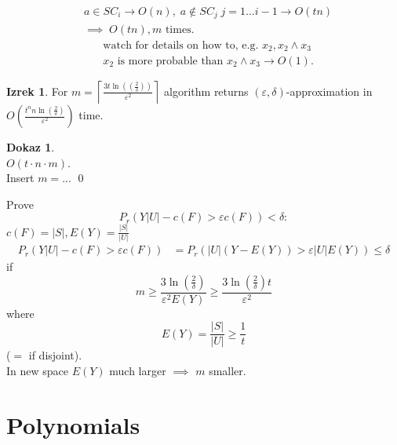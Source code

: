 \documentclass[a4paper, 12pt]{book}
\theoremstyle{definition}
\newtheorem{theorem}[counter]{Izrek}
\newtheorem{pro}[counter]{Dokaz}
\theoremstyle{remark}
\begin{document}
\begin{align}
  &a \in SC_i \to O(n), \; a \notin SC_j \; j = 1 \dots i-1 \to O(tn) \label{eq:sci} \\
  &\implies \; O(tn), m \text{ times}. \nonumber
\end{align}
\begin{align}
  &\text{watch for details on how to, e.g. } x_2, x_2 \land x_3 \label{details} \\
  &x_2 \text{ is more probable than } x_2 \land x_3 \to O(1). \nonumber
\end{align}
\begin{theorem}
  For $m = \left\lceil\frac{3t \ln(\left(\frac{2}{\delta}\right))}{\varepsilon^2}\right\rceil$
  algorithm returns $(\varepsilon,\delta)$-approximation
  in $O\left(\frac{t^n n \ln\left(\frac{2}{\delta}\right)}{\varepsilon^2}\right)$ time.
\end{theorem} 
\begin{pro} \text{} \\
  $O(t \cdot n \cdot m)$. \\
  Insert $m = ...$
  \qed
\end{pro}
Prove
\begin{equation*}
  P_r(Y|U| - c(F) > \varepsilon c(F)) < \delta:
\end{equation*}
$c(F) = |S|, E(Y) = \frac{|S|}{|U|}$
\begin{align*}
  P_r(Y|U| - c(F) > \varepsilon c(F)) &= P_r(|U|(Y - E(Y)) > \varepsilon |U| E(Y)) \leq \delta
\end{align*}
if
\begin{equation*}
  m \geq \frac{3 \ln\left(\frac{2}{\delta}\right)}{\varepsilon^2 E(Y)} \geq \frac{3 \ln\left(\frac{2}{\delta}\right)t}{\varepsilon^2}
\end{equation*}
where
\begin{equation*}
  E(Y) = \frac{|S|}{|U|} \geq \frac{1}{t}
\end{equation*}
($=$ if disjoint). \\
In new space $E(Y)$ much larger $\implies$ $m$ smaller.



\chapter{Polynomials}
\end{document}
